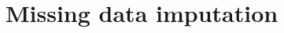 \documentclass[backrefs]{cam-thesis}
\newcommand{\crit}[1]{\textcolor{red}{#1}}
\begin{document}



 

\chapter{Missing data imputation}
\end{document}
